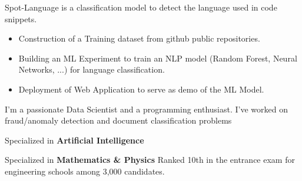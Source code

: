 \documentclass[10pt,letter,ragged2e,withhyper]{altacv}
\renewcommand{\divider}{\textcolor{body!30}{\hdashrule{\linewidth}{0.6pt}{0.5ex}}\medskip}
\begin{document}
\begin{paracol}{2}
Spot-Language is a classification model to detect the language used in code snippets.

\begin{itemize}
      \item Construction of a Training dataset from github public repositories.
      \item Building an ML Experiment to train an NLP model (Random Forest, Neural Networks, ...) for language classification.
      \item Deployment of Web Application to serve as demo of the ML Model.
  \end{itemize}



\switchcolumn
{}
{\small
I'm a passionate Data Scientist and a programming enthusiast. I've worked on fraud/anomaly detection and document classification problems
}


{\small Specialized in \textbf{Artificial Intelligence}}

\divider
{}
{\small Specialized in \textbf{Mathematics \& Physics}}
{\small Ranked 10th in the entrance exam for engineering schools among 3,000 candidates.}





\divider
{}

\divider
{}

\divider
{}


\end{paracol}
\end{document}
